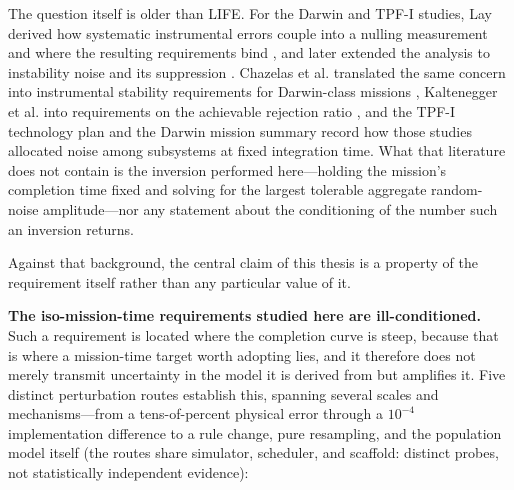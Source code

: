 \documentclass[12pt,a4paper]{article}
\numberwithin{equation}{section}
\numberwithin{figure}{section}
\numberwithin{table}{section}
\begin{document}
The question itself is older than LIFE. For the Darwin and TPF-I studies, Lay derived how systematic instrumental errors couple into a nulling measurement and where the resulting requirements bind \cite{lay2004systematic}, and later extended the analysis to instability noise and its suppression \cite{lay2006instability}. Chazelas et al. translated the same concern into instrumental stability requirements for Darwin-class missions \cite{chazelas2006stability}, Kaltenegger et al. into requirements on the achievable rejection ratio \cite{kaltenegger2006rejection}, and the TPF-I technology plan \cite{lawson2005tpfitech} and the Darwin mission summary \cite{cockell2009darwin} record how those studies allocated noise among subsystems at fixed integration time. What that literature does not contain is the inversion performed here---holding the mission's completion time fixed and solving for the largest tolerable aggregate random-noise amplitude---nor any statement about the conditioning of the number such an inversion returns.

Against that background, the central claim of this thesis is a property of the requirement itself rather than any particular value of it.

\textbf{The iso-mission-time requirements studied here are ill-conditioned.} Such a requirement is located where the completion curve is steep, because that is where a mission-time target worth adopting lies, and it therefore does not merely transmit uncertainty in the model it is derived from but amplifies it. Five distinct perturbation routes establish this, spanning several scales and mechanisms---from a tens-of-percent physical error through a $10^{-4}$ implementation difference to a rule change, pure resampling, and the population model itself (the routes share simulator, scheduler, and scaffold: distinct probes, not statistically independent evidence):
\end{document}
